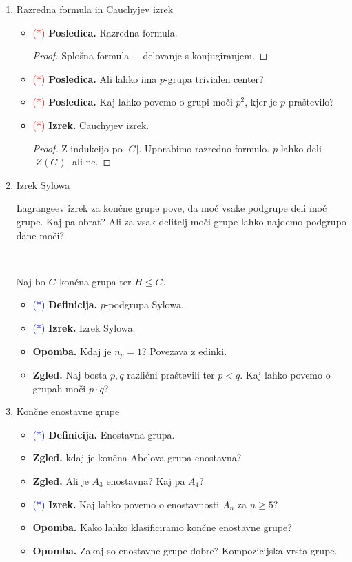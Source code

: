 \begin{enumerate}
    \item Razredna formula in Cauchyjev izrek
    \begin{itemize}
        \item \textcolor{red}{(*)} \textbf{Posledica.} Razredna formula.
        \begin{proof}
            Splošna formula + delovanje s konjugiranjem.
        \end{proof}
        \item \textcolor{red}{(*)} \textbf{Posledica.} Ali lahko ima \(p\)-grupa trivialen center?
        \item \textcolor{red}{(*)} \textbf{Posledica.} Kaj lahko povemo o grupi moči \(p^2\), kjer je \(p\) praštevilo?
        \item \textcolor{red}{(*)} \textbf{Izrek.} Cauchyjev izrek.
        \begin{proof}
            Z indukcijo po \(|G|\). Uporabimo razredno formulo. \(p\) lahko deli \(|Z(G)|\) ali ne.
        \end{proof}
    \end{itemize}

    \item Izrek Sylowa
    
    Lagrangeev izrek za končne grupe pove, da moč vsake podgrupe deli moč grupe. Kaj pa obrat? Ali za vsak delitelj moči grupe lahko najdemo podgrupo dane moči?
    
    \ 

    Naj bo \(G\) končna grupa ter \(H \leq G\).
    \begin{itemize}
        \item \textcolor{blue}{(*)} \textbf{Definicija.} \(p\)-podgrupa Sylowa.
        \item \textcolor{blue}{(*)} \textbf{Izrek.} Izrek Sylowa.
        \item \textbf{Opomba.} Kdaj je \(n_p = 1\)? Povezava z edinki.
        \item \textbf{Zgled.} Naj bosta \(p, q\) različni praštevili ter \(p < q\). Kaj lahko povemo o grupah moči \(p \cdot q\)?
    \end{itemize}

    \item Končne enostavne grupe
    \begin{itemize}
        \item \textcolor{blue}{(*)} \textbf{Definicija.} Enostavna grupa.
        \item \textbf{Zgled.} kdaj je končna Abelova grupa enostavna?
        \item \textbf{Zgled.} Ali je \(A_3\) enostavna? Kaj pa \(A_4\)?
        \item \textcolor{blue}{(*)} \textbf{Izrek.} Kaj lahko povemo o enostavnosti \(A_n\) za \(n \geq 5\)?
        \item \textbf{Opomba.} Kako lahko klasificiramo končne enostavne grupe?
        \item \textbf{Opomba.} Zakaj so enostavne grupe dobre? Kompozicijska vrsta grupe.
    \end{itemize}


\end{enumerate}
